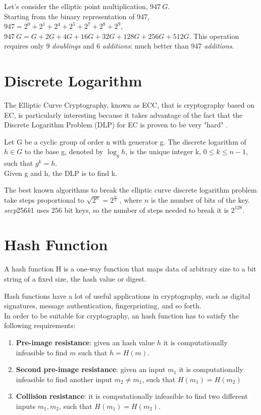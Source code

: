 \begin{example}
Let's consider the elliptic point multiplication, $947\ G$.\\ Starting from the binary representation of 947, $947=2^{0}+2^{1}+2^{4}+2^{5}+2^{7}+2^{8}+2^{9}$, $947\ G=G+2G+4G+16G+32G+128G+256G+512G$. This operation requires only 9 \textit{doublings} and 6 \textit{additions}: much better than 947 \textit{additions}.
\end{example}

\section{Discrete Logarithm}
The Elliptic Curve Cryptography, known as ECC, that is cryptography based on EC, is particularly interesting because it takes advantage of the fact that the Discrete Logarithm Problem (DLP) for EC is proven to be very "hard" \cite{ECC}.
\begin{teorema}
	Let G be a cyclic group of order n with generator g. The discrete logarithm of $h\in G$ to the base g, denoted by $\log_{g} h$, is the unique integer k, $0\leq k \leq n-1$, such that $g^{k}=h$.\\
	Given g and h, the DLP is to find k.
\end{teorema}
The best known algorithms to break the elliptic curve discrete logarithm problem take steps proportional to $\sqrt{2^{n}} = 2^{\frac{n}{2}}$ , where $n$ is the number of bits of the key. \textit{secp}256\textit{k}1 uses 256 bit keys, so the number of steps needed to break it is $2^{128}$.

\section{Hash Function}
\begin{teorema}
	A hash function H is a one-way function that maps data of arbitrary size to a bit string of a fixed size, the hash value or digest.
\end{teorema}
Hash functions have a lot of useful applications in cryptography, such as digital signatures, message authentication, fingerprinting, and so forth.\\
In order to be suitable for cryptography, an hash function has to satisfy the following requirements:
\begin{enumerate}
	\item \textbf{Pre-image resistance}: given an hash value $h$ it is computationally infeasible to find $m$ such that $h=H(m)$.
	\item \textbf{Second pre-image resistance}: given an input $m_{1}$ it is computationally infeasible to find another input $m_{2}\neq m_{1}$, such that $H(m_{1})=H(m_{2})$
	\item \textbf{Collision resistance}: it is computationally infeasible to find two different inputs $m_{1}, m_{2}$, such that $H(m_{1})=H(m_{2})$.
\end{enumerate}

